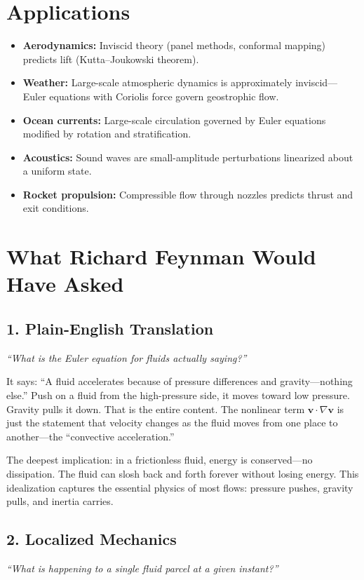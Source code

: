 \documentclass[11pt,openright]{book}
\begin{document}
\section*{Applications}

\begin{itemize}
\item \textbf{Aerodynamics:} Inviscid theory (panel methods, conformal mapping) predicts lift (Kutta--Joukowski theorem).
\item \textbf{Weather:} Large-scale atmospheric dynamics is approximately inviscid---Euler equations with Coriolis force govern geostrophic flow.
\item \textbf{Ocean currents:} Large-scale circulation governed by Euler equations modified by rotation and stratification.
\item \textbf{Acoustics:} Sound waves are small-amplitude perturbations linearized about a uniform state.
\item \textbf{Rocket propulsion:} Compressible flow through nozzles predicts thrust and exit conditions.
\end{itemize}
\section*{What Richard Feynman Would Have Asked}

\subsection*{1. Plain-English Translation}
\textit{``What is the Euler equation for fluids actually saying?''}

It says: ``A fluid accelerates because of pressure differences and gravity---nothing else.'' Push on a fluid from the high-pressure side, it moves toward low pressure. Gravity pulls it down. That is the entire content. The nonlinear term $\mathbf{v} \cdot \nabla \mathbf{v}$ is just the statement that velocity changes as the fluid moves from one place to another---the ``convective acceleration.''

The deepest implication: in a frictionless fluid, energy is conserved---no dissipation. The fluid can slosh back and forth forever without losing energy. This idealization captures the essential physics of most flows: pressure pushes, gravity pulls, and inertia carries.

\subsection*{2. Localized Mechanics}
\textit{``What is happening to a single fluid parcel at a given instant?''}
\end{document}
